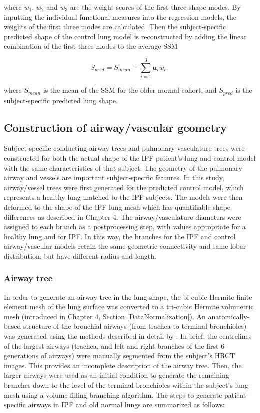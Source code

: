 \noindent where $w_1$, $w_2$ and $w_3$ are the weight scores of the first three shape modes. By inputting the individual functional measures into the regression models, the weights of the first three modes are calculated. Then the subject-specific predicted shape of the control lung model is reconstructed by adding the linear combination of the first three modes to the average SSM

\begin{equation}
 \label{eq:NormalLungPrediction}
 S_{pred} = S_{mean} + \sum_{i=1}^3 \mathbf{u}_i w_{i},
\end{equation}

\noindent where $S_{mean}$ is the mean of the SSM for the older normal cohort, and $S_{pred}$ is the subject-specific predicted lung shape. 

\subsection{Construction of airway/vascular geometry} \label{AirwayVesselGeometry}
Subject-specific conducting airway trees and pulmonary vasculature trees were constructed for both the actual shape of the IPF patient's lung and control model with the same characteristics of that subject. The geometry of the pulmonary airway and vessels are important subject-specific features. In this study, airway/vessel trees were first generated for the predicted control model, which represents a healthy lung matched to the IPF subjects. The models were then deformed to the shape of the IPF lung mesh which has quantifiable shape differences as described in Chapter 4. The airway/vasculature diameters were assigned to each branch as a postprocessing step, with values appropriate for a healthy lung and for IPF. In this way, the branches for the IPF and control airway/vascular models retain the same geometric connectivity and same lobar distribution, but have different radius and length. 

\subsubsection{Airway tree}
In order to generate an airway tree in the lung shape, the bi-cubic Hermite finite element mesh of the lung surface was converted to a tri-cubic Hermite volumetric mesh (introduced in Chapter 4, Section \ref{DataNormalization}). An anatomically-based structure of the bronchial airways (from trachea to terminal bronchioles) was generated using the methods described in detail by \cite{tawhai2004ct}. In brief, the centrelines of the largest airways (trachea, and left and right branches of the first 6 generations of airways) were manually segmented from the subject's HRCT images. This provides an incomplete description of the airway tree. Then, the larger airways were used as an initial condition to generate the remaining branches down to the level of the terminal bronchioles within the subject's lung mesh using a volume-filling branching algorithm. The steps to generate patient-specific airways in IPF and old normal lungs are summarized as follows:

